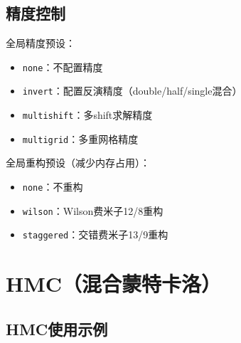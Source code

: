 \documentclass[12pt,a4paper]{ctexart}
\begin{document}
\subsection{精度控制}

全局精度预设：
\begin{itemize}[leftmargin=*]
    \item \texttt{none}：不配置精度
    \item \texttt{invert}：配置反演精度（double/half/single混合）
    \item \texttt{multishift}：多shift求解精度
    \item \texttt{multigrid}：多重网格精度
\end{itemize}

全局重构预设（减少内存占用）：
\begin{itemize}[leftmargin=*]
    \item \texttt{none}：不重构
    \item \texttt{wilson}：Wilson费米子12/8重构
    \item \texttt{staggered}：交错费米子13/9重构
\end{itemize}

\section{HMC（混合蒙特卡洛）}

\subsection{HMC使用示例}
\end{document}

